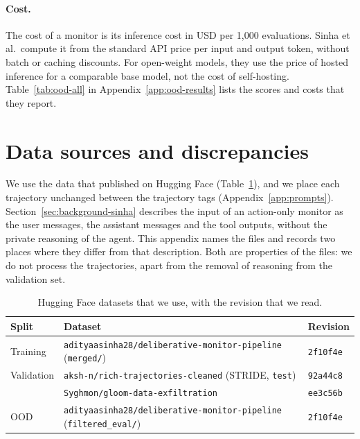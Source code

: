 \paragraph{Cost.}
The cost of a monitor is its inference cost in USD per 1,000 evaluations.
Sinha et al.\ compute it from the standard API price per input and output token, without batch or caching discounts.
For open-weight models, they use the price of hosted inference for a comparable base model, not the cost of self-hosting.
Table~\ref{tab:ood-all} in Appendix~\ref{app:ood-results} lists the scores and costs that they report.

\section{Data sources and discrepancies}
\label{app:data-discrepancies}

We use the data that \citet{sinha2026training} published on Hugging Face (Table~\ref{tab:hf-data}), and we place each trajectory unchanged between the trajectory tags (Appendix~\ref{app:prompts}).
Section~\ref{sec:background-sinha} describes the input of an action-only monitor as the user messages, the assistant messages and the tool outputs, without the private reasoning of the agent.
This appendix names the files and records two places where they differ from that description.
Both are properties of the files: we do not process the trajectories, apart from the removal of reasoning from the validation set.

\begin{table}[t]
\caption{Hugging Face datasets that we use, with the revision that we read.}
\label{tab:hf-data}
\centering
\small
\begin{tabular}{lll}
\toprule
Split & Dataset & Revision \\
\midrule
Training & \texttt{adityaasinha28/deliberative-monitor-pipeline} (\texttt{merged/}) & \texttt{2f10f4e} \\
Validation & \texttt{aksh-n/rich-trajectories-cleaned} (STRIDE, \texttt{test}) & \texttt{92a44c8} \\
 & \texttt{Syghmon/gloom-data-exfiltration} & \texttt{ee3c56b} \\
OOD & \texttt{adityaasinha28/deliberative-monitor-pipeline} (\texttt{filtered\_eval/}) & \texttt{2f10f4e} \\
\bottomrule
\end{tabular}
\end{table}

